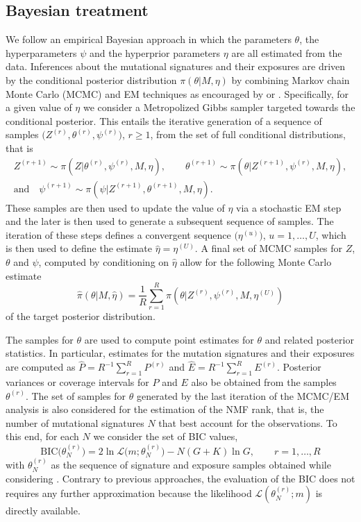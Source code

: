 \documentclass{bioinfo}
\begin{document}
\subsection{Bayesian treatment}
We follow an empirical Bayesian approach in which the parameters
$\theta$, the hyperparameters $\psi$ and the hyperprior parameters
$\eta$ are all estimated from the data.  Inferences about the
mutational signatures and their exposures are driven by the
conditional posterior distribution $\pi(\theta|M, \eta)$ by combining
Markov chain Monte Carlo (MCMC) and EM techniques as
encouraged by \cite{C01} or \cite{LC}. Specifically, for a given value
of $\eta$ we consider a Metropolized Gibbs sampler targeted towards
the conditional posterior. This entails the iterative generation of a
sequence of samples $\big(Z^{(r)}, \theta^{(r)}, \psi^{(r)}\big)$, $r
\geqslant 1$, from the set of full conditional distributions, that is 
\begin{gather*}
   Z^{(r+1)} \sim \pi(Z| \theta^{(r)}, \psi^{(r)}, M, \eta), \qquad
   \theta^{(r+1)} \sim \pi(\theta| Z^{(r+1)}, \psi^{(r)}, M, \eta), \\
       \text{and}\quad
   \psi^{(r+1)} \sim \pi(\psi| Z^{(r+1)}, \theta^{(r+1)}, M, \eta).
\end{gather*}
These samples are then used to update the value of $\eta$ via a
stochastic EM step and the later is then used to generate a subsequent
sequence of samples. The iteration of these steps defines a 
convergent sequence $\big(\eta^{(u)}\big)$, $u = 1, \ldots, U$, which
is then used to define the estimate $\hat\eta = \eta^{(U)}$. A final
set of MCMC samples for $Z$, $\theta$ and $\psi$, computed by
conditioning on $\hat\eta$ allow for the following Monte Carlo
estimate 
\begin{equation}
 \label{eqn:MCEM_estimate}
   \widehat{\pi}(\theta|M, \hat\eta)
 = 
   \frac{1}{R}\sum_{r=1}^R \pi(\theta|Z^{(r)}, \psi^{(r)}, M,
   \eta^{(U)})
\end{equation}
of the target posterior distribution.


The samples for $\theta$ are used to compute point estimates for
$\theta$ and related posterior statistics. In particular, estimates
for the mutation signatures and their exposures are computed as
$\widehat P = R^{-1}\sum_{r=1}^R P^{(r)}$ and $\widehat E =
R^{-1}\sum_{r=1}^R E^{(r)}$. Posterior variances or coverage intervals
for $P$ and $E$ also be obtained from the samples $\theta^{(r)}$. The
set of samples for $\theta$ generated by the last iteration of the
MCMC/EM analysis is also considered for the estimation of the NMF
rank, that is, the number of mutational signatures $N$ that best
account for the observations. To this end, for each $N$ we consider
the set of BIC values,
\[
  \text{BIC}\big(\theta^{(r)}_N\big) = 2\ln\mathcal L\big(m;
    \theta^{(r)}_{N}\big) - N(G+K)\ln G, \qquad r =1, \ldots,
    R
\]
with $\theta^{(r)}_N$ as the sequence of signature and exposure
samples obtained while considering . Contrary to previous approaches,
the evaluation of the BIC does not requires any further approximation
because the likelihood $\mathcal L(\theta^{(r)}_N; m)$ is directly 
available.
\end{document}
